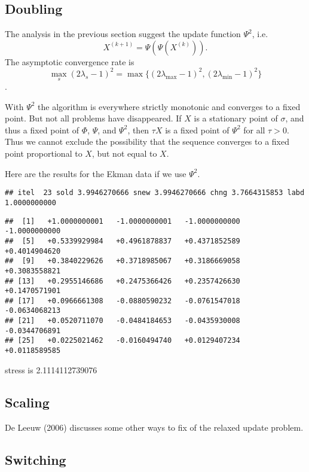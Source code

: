 \documentclass[
  12pt,
]{article}
\begin{document}
\subsection{Doubling}\label{doubling}

The analysis in the previous section suggest the update function \(\Psi^2\), i.e.
\[
X^{(k+1)}=\Psi(\Psi(X^{(k)})).
\]
The asymptotic convergence rate is
\[
\max_s (2\lambda_s-1)^2=\max\{ (2\lambda_\text{max}-1)^2, (2\lambda_\text{min}-1)^2\}
\].

With \(\Psi^2\) the algorithm is everywhere strictly monotonic and
converges to a fixed point. But not all problems have disappeared.
If \(X\) is a stationary point of \(\sigma\), and thus a fixed
point of \(\Phi\), \(\Psi\), and \(\Psi^2\), then \(\tau X\) is a
fixed point of \(\Psi^2\) for all \(\tau>0\). Thus we cannot
exclude the possibility that the sequence converges to
a fixed point proportional to \(X\), but not equal to \(X\).

Here are the results for the Ekman data if we use \(\Psi^2\).

\begin{verbatim}
## itel  23 sold 3.9946270666 snew 3.9946270666 chng 3.7664315853 labd 1.0000000000
\end{verbatim}

\begin{verbatim}
##  [1]   +1.0000000001   -1.0000000001   -1.0000000000   -1.0000000000
##  [5]   +0.5339929984   +0.4961878837   +0.4371852589   +0.4014904620
##  [9]   +0.3840229626   +0.3718985067   +0.3186669058   +0.3083558821
## [13]   +0.2955146686   +0.2475366426   +0.2357426630   +0.1470571901
## [17]   +0.0966661308   -0.0880590232   -0.0761547018   -0.0634068213
## [21]   +0.0520711070   -0.0484184653   -0.0435930008   -0.0344706891
## [25]   +0.0225021462   -0.0160494740   +0.0129407234   +0.0118589585
\end{verbatim}

stress is 2.1114112739076

\subsection{Scaling}\label{scaling}

De Leeuw (2006) discusses some other ways to fix of the relaxed update problem.

\subsection{Switching}\label{switching}
\end{document}
